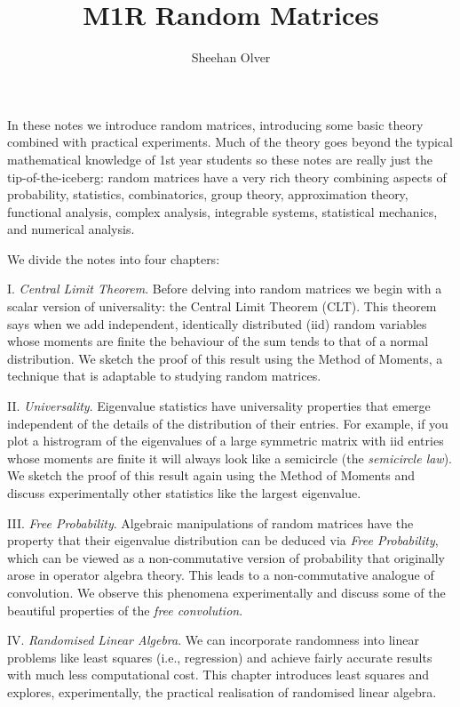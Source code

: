 \documentclass[12pt,a4paper]{book}
\title{ M1R Random Matrices }
\author{ Sheehan Olver }
\theoremstyle{definition}
\begin{document}
\maketitle

\tableofcontents

\vfill\eject

In these notes we introduce random matrices, introducing some basic theory combined with practical experiments.  Much of the theory goes beyond the typical mathematical knowledge of 1st year students so these notes are really just the tip-of-the-iceberg: random matrices have a very rich theory combining aspects of probability, statistics, combinatorics, group theory, approximation theory, functional analysis, complex analysis, integrable systems, statistical mechanics, and numerical analysis. 

We divide the notes into four chapters:

I. \emph{Central Limit Theorem}. Before delving into random matrices we begin with a scalar version of universality: the Central Limit Theorem (CLT). This theorem says when we add independent, identically distributed (iid) random variables whose moments are finite the behaviour of the sum tends to that of a normal distribution. We sketch the proof of this result using the Method of Moments, a technique that is adaptable to studying random matrices.

II. \emph{Universality}. Eigenvalue statistics have universality properties that emerge independent of the details of the distribution of their entries. For example, if you plot a histrogram of the eigenvalues of a large symmetric matrix with iid entries whose moments are finite it will always look like a semicircle (the \emph{semicircle law}). We sketch the proof of this result again using the Method of Moments and discuss experimentally other statistics like the largest eigenvalue.

III. \emph{Free Probability}. Algebraic manipulations of random matrices have the property that their eigenvalue distribution can be deduced via \emph{Free Probability}, which can be viewed as a non-commutative version of probability that originally arose in operator algebra theory. This leads to a non-commutative analogue  of convolution. We observe this phenomena experimentally and discuss some of the beautiful properties of the \emph{free convolution}. 

IV. \emph{Randomised Linear Algebra}. We can incorporate randomness into linear problems like least squares (i.e., regression) and achieve fairly accurate results with much less computational cost. This chapter introduces least squares and explores, experimentally, the practical realisation of randomised linear algebra.
\end{document}
